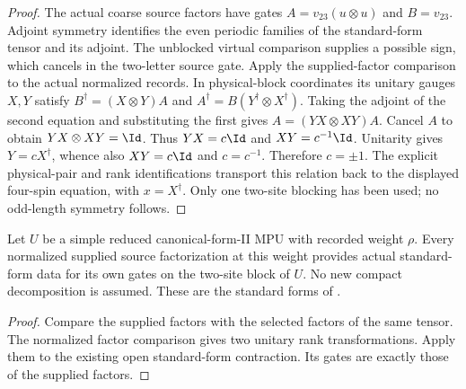 \begin{proof}\leanok
    The actual coarse source factors have gates
    $A=v_{23}(u\otimes u)$ and $B=v_{23}$. Adjoint symmetry identifies
    the even periodic families of the standard-form tensor and its adjoint.
    The unblocked virtual comparison supplies a possible sign, which cancels
    in the two-letter source gate. Apply the supplied-factor comparison to
    the actual normalized records. In physical-block coordinates its unitary
    gauges $X,Y$ satisfy $B^\dagger=(X\otimes Y)A$ and
    $A^\dagger=B(Y^\dagger\otimes X^\dagger)$. Taking the adjoint of the
    second equation and substituting the first gives
    $A=(YX\otimes XY)A$. Cancel $A$ to obtain $YX\otimes XY=\Id$.
    Thus $YX=c\Id$ and $XY=c^{-1}\Id$. Unitarity gives $Y=cX^\dagger$,
    whence also $XY=c\Id$ and $c=c^{-1}$. Therefore $c=\pm1$.
    The explicit physical-pair and rank identifications transport this
    relation back to the displayed four-spin equation, with $x=X^\dagger$.
    Only one two-site blocking has been used; no odd-length symmetry follows.
\end{proof}

\begin{lemma}
    \label{lem:mpu_standard_form_from_normalized_source_factors}
    \leanok
    Let $U$ be a simple reduced canonical-form-II MPU with recorded weight
    $\rho$. Every normalized supplied source factorization at this weight
    provides actual standard-form data for its own gates on the two-site
    block of $U$. No new compact decomposition is assumed. These are the
    standard forms of \cite[lines~603--648]{Cirac2017MPU}.
\end{lemma}

\begin{proof}\leanok
    Compare the supplied factors with the selected factors of the same tensor.
    The normalized factor comparison gives two unitary rank transformations.
    Apply them to the existing open standard-form contraction. Its gates are
    exactly those of the supplied factors.
\end{proof}

